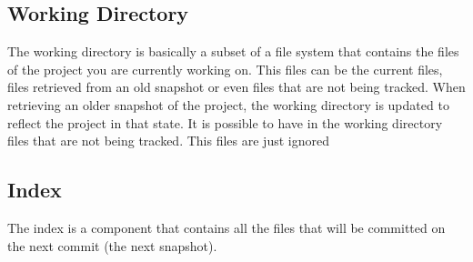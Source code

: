 
\subsection{Working Directory}

The working directory is basically a subset of
a file system that contains the files of the project you are
currently working on. This files can be the current files, files
retrieved from an old snapshot or even files that are not being
tracked. When retrieving an older snapshot of the project, the
working directory is updated to reflect the project in that state. It
is possible to have in the working directory files that are not being
tracked. This files are just ignored

\subsection{Index}
The index is a component that contains all the files that will be committed
on the next commit (the next snapshot).

